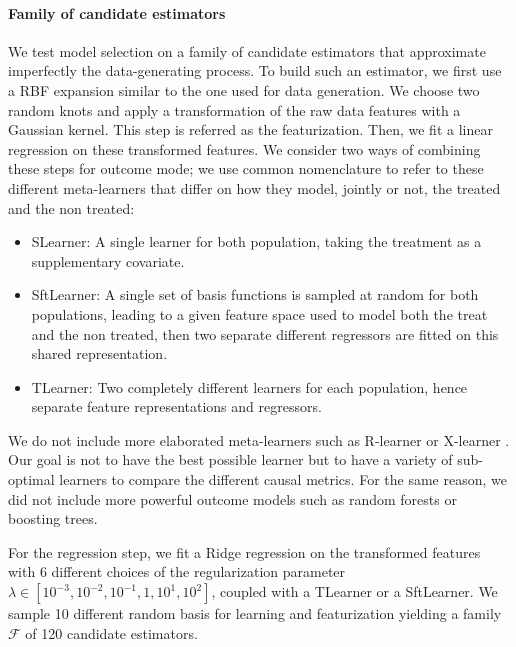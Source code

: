 \documentclass{report}
\begin{document}
\paragraph{Family of candidate estimators}

We test model selection on a family of candidate estimators that
approximate imperfectly the data-generating process. To build such an
estimator, we first use a RBF expansion
similar to the one used for data generation.
We choose two random knots and apply a transformation of the raw data features
with a Gaussian kernel. This step
is referred as the featurization. Then, we fit a linear regression on
these
transformed features. We consider two ways of combining these steps for outcome
mode; we use common nomenclature \citep{kunzel_metalearners_2019,shen2023rctrep} to refer
to these different meta-learners that differ on how
they model, jointly or not, the treated and the non treated:
\begin{itemize}
  \item SLearner: A single learner for both population, taking the treatment as
        a supplementary covariate.

  \item SftLearner: A single set of basis functions is sampled at random for both
        populations, leading to a given feature space used to model both the treat and
        the non treated, then two
        separate different regressors are fitted on this shared representation.
  \item TLearner: Two completely different learners for each population, hence
        separate feature representations and regressors.
\end{itemize}

We do not include more elaborated meta-learners such as R-learner
\citep{nie_quasioracle_2017} or X-learner
\citep{kunzel_metalearners_2019}. Our goal is not to have the best possible
learner but to have a variety of sub-optimal learners to compare the
different causal metrics. For the same reason, we did not include more powerful
outcome models such as random forests or boosting trees.

For the regression step, we fit a Ridge regression on the transformed features
with 6 different choices of the regularization parameter $\lambda \in [10^{-3},
    10^{-2}, 10^{-1}, 1, 10^{1}, 10^{2}]$, coupled with a TLearner or a SftLearner.
We sample 10 different random basis for learning and
featurization yielding a family $\mathcal F$ of 120 candidate estimators.
%
\end{document}
